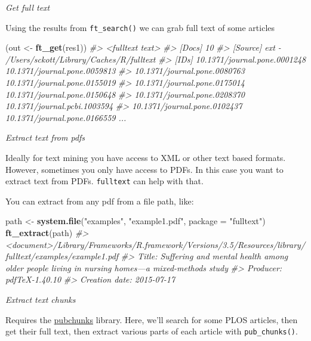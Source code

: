 \documentclass[author-year, review, 11pt]{components/elsarticle} %
\newenvironment{Shaded}{\begin{snugshade}}{\end{snugshade}}
\newcommand{\CommentTok}[1]{\textcolor[rgb]{0.56,0.35,0.01}{\textit{#1}}}
\newcommand{\DataTypeTok}[1]{\textcolor[rgb]{0.13,0.29,0.53}{#1}}
\newcommand{\KeywordTok}[1]{\textcolor[rgb]{0.13,0.29,0.53}{\textbf{#1}}}
\newcommand{\NormalTok}[1]{#1}
\newcommand{\StringTok}[1]{\textcolor[rgb]{0.31,0.60,0.02}{#1}}
\begin{document}
\emph{Get full text}

Using the results from \texttt{ft\_search()} we can grab full text of
some articles

\begin{Shaded}
\begin{Highlighting}[]
\NormalTok{(out <-}\StringTok{ }\KeywordTok{ft_get}\NormalTok{(res1))}
\CommentTok{#> <fulltext text>}
\CommentTok{#> [Docs] 10 }
\CommentTok{#> [Source] ext - /Users/sckott/Library/Caches/R/fulltext }
\CommentTok{#> [IDs] 10.1371/journal.pone.0001248 10.1371/journal.pone.0059813}
\CommentTok{#>      10.1371/journal.pone.0080763 10.1371/journal.pone.0155019}
\CommentTok{#>      10.1371/journal.pone.0175014 10.1371/journal.pone.0150648}
\CommentTok{#>      10.1371/journal.pone.0208370 10.1371/journal.pcbi.1003594}
\CommentTok{#>      10.1371/journal.pone.0102437 10.1371/journal.pone.0166559 ...}
\end{Highlighting}
\end{Shaded}

\emph{Extract text from pdfs}

Ideally for text mining you have access to XML or other text based
formats. However, sometimes you only have access to PDFs. In this case
you want to extract text from PDFs. \texttt{fulltext} can help with
that.

You can extract from any pdf from a file path, like:

\begin{Shaded}
\begin{Highlighting}[]
\NormalTok{path <-}\StringTok{ }\KeywordTok{system.file}\NormalTok{(}\StringTok{"examples"}\NormalTok{, }\StringTok{"example1.pdf"}\NormalTok{, }\DataTypeTok{package =} \StringTok{"fulltext"}\NormalTok{)}
\KeywordTok{ft_extract}\NormalTok{(path)}
\CommentTok{#> <document>/Library/Frameworks/R.framework/Versions/3.5/Resources/library/fulltext/examples/example1.pdf}
\CommentTok{#>   Title: Suffering and mental health among older people living in nursing homes---a mixed-methods study}
\CommentTok{#>   Producer: pdfTeX-1.40.10}
\CommentTok{#>   Creation date: 2015-07-17}
\end{Highlighting}
\end{Shaded}

\emph{Extract text chunks}

Requires the \href{https://github.com/ropensci/pubchunks}{pubchunks}
library. Here, we'll search for some PLOS articles, then get their full
text, then extract various parts of each article with
\texttt{pub\_chunks()}.
\end{document}
